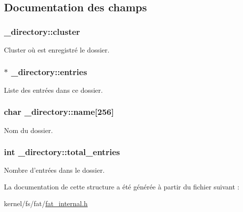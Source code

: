 \subsection{Documentation des champs}
\hypertarget{struct__directory_a5a45241095c7fb2a39f158638631ddbc}{
\subsubsection[{cluster}]{ \-\_\-directory\-::cluster}}\label{struct__directory_a5a45241095c7fb2a39f158638631ddbc}
Cluster où est enregistré le dossier. \hypertarget{struct__directory_a2aa96162372442698a14e116ce88110d}{
\subsubsection[{entries}]{$\ast$ \-\_\-directory\-::entries}}\label{struct__directory_a2aa96162372442698a14e116ce88110d}
Liste des entrées dans ce dossier. \hypertarget{struct__directory_a535c678fe29215d35ac64200865147a4}{
\subsubsection[{name}]{\setlength{\rightskip}{0pt plus 5cm}char \-\_\-directory\-::name\mbox{[}256\mbox{]}}}\label{struct__directory_a535c678fe29215d35ac64200865147a4}
Nom du dossier. \hypertarget{struct__directory_aeb73476149e19828774d4dfbd96a051f}{
\subsubsection[{total\-\_\-entries}]{\setlength{\rightskip}{0pt plus 5cm}int \-\_\-directory\-::total\-\_\-entries}}\label{struct__directory_aeb73476149e19828774d4dfbd96a051f}
Nombre d'entrées dans le dossier. 

La documentation de cette structure a été générée à partir du fichier suivant \-:\begin{DoxyCompactItemize}
\item 
kernel/fs/fat/\hyperlink{fat__internal_8h}{fat\-\_\-internal.\-h}\end{DoxyCompactItemize}
